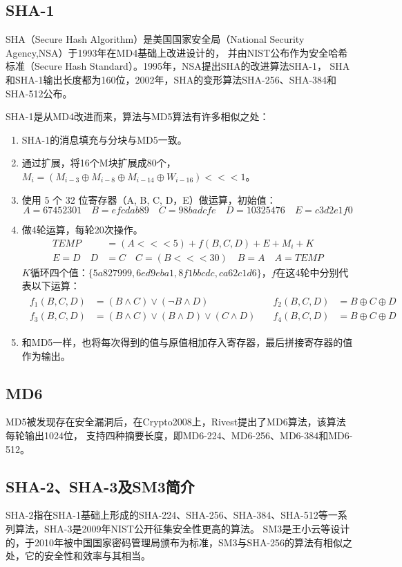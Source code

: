 \subsection{SHA-1}
SHA（Secure Hash Algorithm）是美国国家安全局（National Security Agency,NSA）于1993年在MD4基础上改进设计的，
并由NIST公布作为安全哈希标准（Secure Hash Standard）。1995年，NSA提出SHA的改进算法SHA-1，
SHA和SHA-1输出长度都为160位，2002年，SHA的变形算法SHA-256、SHA-384和SHA-512公布。

SHA-1是从MD4改进而来，算法与MD5算法有许多相似之处：
\begin{enumerate}
    \item SHA-1的消息填充与分块与MD5一致。
    \item 通过扩展，将16个M块扩展成80个，$M_{i} = ( M_{i-3} \oplus M_{i-8} \oplus M_{i-14} \oplus W_{i-16}) <<< 1$。
    \item 使用 5 个 32 位寄存器（A, B, C, D，E）做运算，初始值：
$$
A = 67452301 \quad B = efcdab89 \quad C = 98badcfe \quad D = 10325476 \quad E = c3d2e1f0
$$
    \item 做4轮运算，每轮20次操作。
\begin{align*}
TEMP &= (A <<< 5) + f(B, C, D) + E + M_i + K \\
E = D \quad D &= C \quad C = (B <<< 30) \quad B = A \quad A = TEMP
\end{align*}
$K$循环四个值：$\{5a827999,6ed9eba1,8f1bbcdc,ca62c1d6\}$，$f$在这4轮中分别代表以下运算：
$$
\begin{aligned}
\begin{aligned}
f_1(B, C, D) &= (B \land C) \lor (\lnot B \land D) \quad &f_2(B, C, D) &= B \oplus C \oplus D \\
f_3(B, C, D) &= (B \land C) \lor (B \land D) \lor (C \land D) \quad &f_4(B, C, D) &= B \oplus C \oplus D 
\end{aligned}
\end{aligned}
$$
    \item 和MD5一样，也将每次得到的值与原值相加存入寄存器，最后拼接寄存器的值作为输出。
\end{enumerate}

\subsection{MD6}
MD5被发现存在安全漏洞后，在Crypto2008上，Rivest提出了MD6算法，该算法每轮输出1024位，
支持四种摘要长度，即MD6-224、MD6-256、MD6-384和MD6-512。


\subsection{SHA-2、SHA-3及SM3简介}
SHA-2指在SHA-1基础上形成的SHA-224、SHA-256、SHA-384、SHA-512等一系列算法，SHA-3是2009年NIST公开征集安全性更高的算法。
SM3是王小云等设计的，于2010年被中国国家密码管理局颁布为标准，SM3与SHA-256的算法有相似之处，它的安全性和效率与其相当。